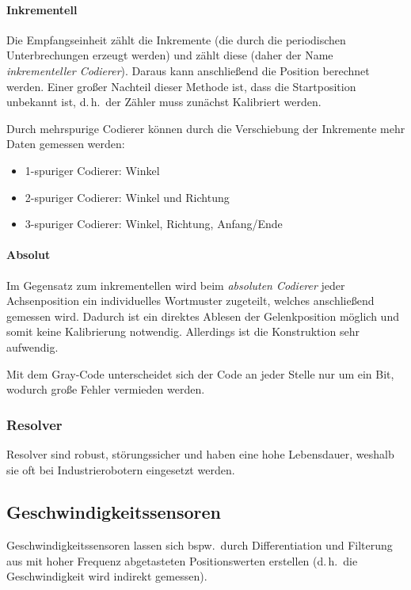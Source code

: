 \documentclass[a4paper, 11pt, accentcolor = tud3b]{tudreport}
\renewcommand{\dh}{d.\,h.~}
\newcommand{\bspw}{bspw.~}
\begin{document}
					\paragraph{Inkrementell}
						Die Empfangseinheit zählt die Inkremente (die durch die periodischen Unterbrechungen erzeugt werden) und zählt diese (daher der Name \emph{inkrementeller Codierer}). Daraus kann anschließend die Position berechnet werden. Einer großer Nachteil dieser Methode ist, dass die Startposition unbekannt ist, \dh der Zähler muss zunächst Kalibriert werden.
						
						Durch mehrspurige Codierer können durch die Verschiebung der Inkremente mehr Daten gemessen werden:
						\begin{itemize}
							\item 1-spuriger Codierer: Winkel
							\item 2-spuriger Codierer: Winkel und Richtung
							\item 3-spuriger Codierer: Winkel, Richtung, Anfang/Ende
						\end{itemize}

					\paragraph{Absolut}
						Im Gegensatz zum inkrementellen wird beim \emph{absoluten Codierer} jeder Achsenposition ein individuelles Wortmuster zugeteilt, welches anschließend gemessen wird. Dadurch ist ein direktes Ablesen der Gelenkposition möglich und somit keine Kalibrierung notwendig. Allerdings ist die Konstruktion sehr aufwendig.
						
						Mit dem Gray-Code unterscheidet sich der Code an jeder Stelle nur um ein Bit, wodurch große Fehler vermieden werden.

				\subsubsection{Resolver} %
					
					Resolver sind robust, störungssicher und haben eine hohe Lebensdauer, weshalb sie oft bei Industrierobotern eingesetzt werden.

			\subsection{Geschwindigkeitssensoren}
				Geschwindigkeitssensoren lassen sich \bspw durch Differentiation und Filterung aus mit hoher Frequenz abgetasteten Positionswerten erstellen (\dh die Geschwindigkeit wird indirekt gemessen).
\end{document}

